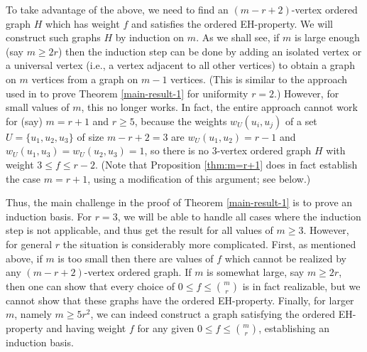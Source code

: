 \documentclass[11pt]{article}
\theoremstyle{plain}
\begin{document}
To take advantage of the above, we need to find an $(m-r+2)$-vertex ordered graph $H$ which has weight $f$ and satisfies the ordered EH-property.
We will construct such graphs $H$ by induction on $m$. As we shall see, if $m$ is large enough (say $m \geq 2r$) then the induction step can be done by adding an isolated vertex or a universal vertex (i.e., a vertex adjacent to all other vertices) to obtain a graph on $m$ vertices from a graph on $m-1$ vertices. (This is similar to the approach used in \cite{ABGMW} to prove Theorem \ref{main-result-1} for uniformity $r=2$.) 
However, for small values of $m$, this no longer works. 
In fact, the entire approach cannot work for (say) $m = r+1$ and $r \geq 5$, because the weights $w_U(u_i,u_j)$ of a set $U = \{u_1,u_2,u_3\}$ of size $m-r+2 = 3$ are $w_U(u_1,u_2) = r-1$ and $w_U(u_1,u_3) = w_U(u_2,u_3) = 1$, so there is no $3$-vertex ordered graph $H$ with weight $3 \leq f \leq r-2$. (Note that Proposition \ref{thm:m=r+1} does in fact establish the case $m=r+1$, using a modification of this argument; see below.) 

Thus, the main challenge in the proof of Theorem \ref{main-result-1} is to prove an induction basis. %
For $r=3$, we will be able to handle all cases where the induction step is not applicable, and thus get the result for all values of $m \geq 3$.
However, for general $r$ the situation is considerably more complicated. 
First, as mentioned above, if $m$ is too small then there are values of $f$ which cannot be realized by any $(m-r+2)$-vertex ordered graph. 
If $m$ is somewhat large, say $m \geq 2r$, then one can show that every choice of $0 \leq f \leq \binom{m}{r}$ is in fact realizable, but we cannot show that these graphs have the ordered EH-property. 
Finally, for larger $m$, namely $m \geq 5 r^2$, we can indeed construct a graph satisfying the ordered EH-property and having weight $f$ for any given $0 \leq f \leq \binom{m}{r}$, establishing an induction \nolinebreak basis. 
\end{document}
